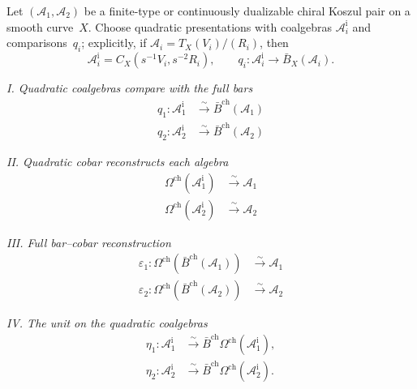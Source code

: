 \begin{theorem}
\label{thm:bar-cobar-isomorphism-main-equations}
Let $(\mathcal{A}_1, \mathcal{A}_2)$ be a finite-type or continuously
dualizable chiral Koszul pair on a smooth curve~$X$. Choose quadratic
presentations with coalgebras $\mathcal A_i^{\mathrm i}$ and
comparisons~$q_i$; explicitly, if
$\mathcal A_i=T_X(V_i)/(R_i)$, then
\[
\mathcal A_i^{\mathrm i}=C_X(s^{-1}V_i,s^{-2}R_i),
\qquad
q_i\colon\mathcal A_i^{\mathrm i}\longrightarrow
\bar B_X(\mathcal A_i).
\]

\medskip
\noindent\emph{I. Quadratic coalgebras compare with the full bars}
\begin{align}
q_1\colon\mathcal A_1^{\mathrm i}
 &\xrightarrow{\sim}\bar{B}^{\text{ch}}(\mathcal{A}_1)
 \label{eq:bar-A1-is-A2-dual} \\
q_2\colon\mathcal A_2^{\mathrm i}
 &\xrightarrow{\sim}\bar{B}^{\text{ch}}(\mathcal{A}_2)
 \label{eq:bar-A2-is-A1-dual}
\end{align}

\medskip
\noindent\emph{II. Quadratic cobar reconstructs each algebra}
\begin{align}
\Omega^{\text{ch}}(\mathcal{A}_1^{\mathrm i})
 &\xrightarrow{\sim}\mathcal{A}_1
 \label{eq:cobar-A2-dual-is-A1} \\
\Omega^{\text{ch}}(\mathcal{A}_2^{\mathrm i})
 &\xrightarrow{\sim}\mathcal{A}_2
 \label{eq:cobar-A1-dual-is-A2}
\end{align}

\medskip
\noindent\emph{III. Full bar--cobar reconstruction}
\begin{align}
\varepsilon_1\colon
\Omega^{\text{ch}}(\bar{B}^{\text{ch}}(\mathcal{A}_1))
 &\xrightarrow{\sim}\mathcal{A}_1
 \label{eq:bar-cobar-resolution-A1} \\
\varepsilon_2\colon
\Omega^{\text{ch}}(\bar{B}^{\text{ch}}(\mathcal{A}_2))
 &\xrightarrow{\sim}\mathcal{A}_2
 \label{eq:bar-cobar-resolution-A2}
\end{align}

\medskip
\noindent\emph{IV. The unit on the quadratic coalgebras}
\begin{align}
\eta_1\colon\mathcal A_1^{\mathrm i}
 &\xrightarrow{\sim}
\bar{B}^{\text{ch}}\Omega^{\text{ch}}(\mathcal A_1^{\mathrm i}),\\
\eta_2\colon\mathcal A_2^{\mathrm i}
 &\xrightarrow{\sim}
\bar{B}^{\text{ch}}\Omega^{\text{ch}}(\mathcal A_2^{\mathrm i}).
\end{align}


\end{theorem}
